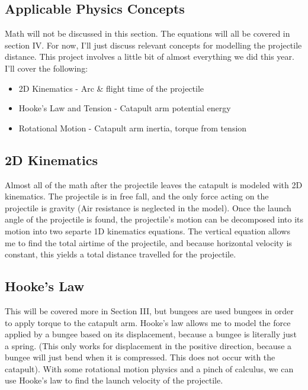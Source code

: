 \documentclass[10pt]{article}
\begin{document}
\begin{flushleft}
\section{Applicable Physics Concepts}
  Math will not be discussed in this section.
  The equations will all be covered in section IV. For now, I'll just discuss relevant concepts for modelling the projectile distance.
  This project involves a little bit of almost everything we did this year. I'll cover the following:
  \begin{itemize}
    \item 2D Kinematics - Arc \& flight time of the projectile
    \item Hooke's Law and Tension - Catapult arm potential energy
    \item Rotational Motion - Catapult arm inertia, torque from tension
  \end{itemize}
  
  \subsection{2D Kinematics}
    Almost all of the math after the projectile leaves the catapult is modeled with 2D kinematics. 
    The projectile is in free fall, and the only force acting on the projectile is gravity 
    (Air resistance is neglected in the model).
    Once the launch angle of the projectile is found, the projectile's motion can be decomposed into its motion into two separte 1D kinematics equations.
    The vertical equation allows me to find the total airtime of the projectile, and because horizontal velocity is constant, this yields a total distance travelled for the projectile.

  \subsection{Hooke's Law}
    This will be covered more in Section III, but bungees are used bungees in order to apply torque to the catapult arm.  
    Hooke's law allows me to model the force applied by a bungee based on its displacement, because a bungee is literally just a spring.
    (This only works for displacement in the positive direction, because a bungee will just bend when it is compressed. 
    This does not occur with the catapult). 
    With some rotational motion physics and a pinch of calculus, we can use Hooke's law to find the launch velocity of the projectile. 


\end{flushleft}
\end{document}
